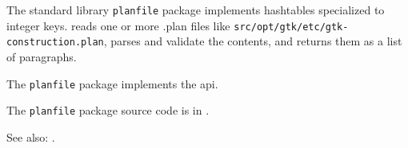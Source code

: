 
The standard library {\tt planfile} package implements hashtables specialized to integer keys.
reads one or more  .plan files like {\tt src/opt/gtk/etc/gtk-construction.plan},
parses and validate the contents, and returns them as a list of paragraphs.

The {\tt planfile} package implements the  api.

The {\tt planfile} package source code is in .

See also:  .


